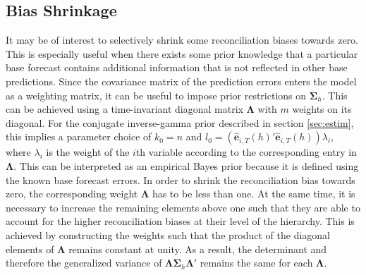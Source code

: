 \documentclass[a4paper,fleqn,11pt]{article}
\begin{document}
\subsection{Bias Shrinkage}\label{sec:weighting}
It may be of interest to selectively shrink some reconciliation biases towards zero. This is especially useful when there exists some prior knowledge that a particular base forecast contains additional information that is not reflected in other base predictions. Since the covariance matrix of the prediction errors enters the model as a weighting matrix, it can be useful to impose prior restrictions on $\boldsymbol{\Sigma}_h$. This can be achieved using a time-invariant diagonal matrix $\boldsymbol{\Lambda}$ with $m$ weights on its diagonal. For the conjugate inverse-gamma prior described in section \ref{sec:estim}, this implies a parameter choice of $k_0 = n $ and $l_0 = (\mathbf{\hat{e}}_{i,T}(h)'\mathbf{\hat{e}}_{i,T}(h)) \lambda_i$, where $\lambda_i$ is the weight of the $i$th variable according to the corresponding entry in $\boldsymbol{\Lambda}$.
This can be interpreted as an empirical Bayes prior because it is defined using the known base forecast errors. In order to shrink the reconciliation bias towards zero, the corresponding weight $\boldsymbol{\Lambda}$ has to be less than one. At the same time, it is necessary to increase the remaining elements above one such that they are able to account for the higher reconciliation biases at their level of the hierarchy. This is achieved by constructing the weights such that the product of the diagonal elements of $\boldsymbol{\Lambda}$ remains constant at unity. As a result, the determinant and therefore the generalized variance of $\boldsymbol{\Lambda} \boldsymbol{\Sigma}_h \boldsymbol{\Lambda}'$ remains the same for each $\boldsymbol{\Lambda}$.
\end{document}
